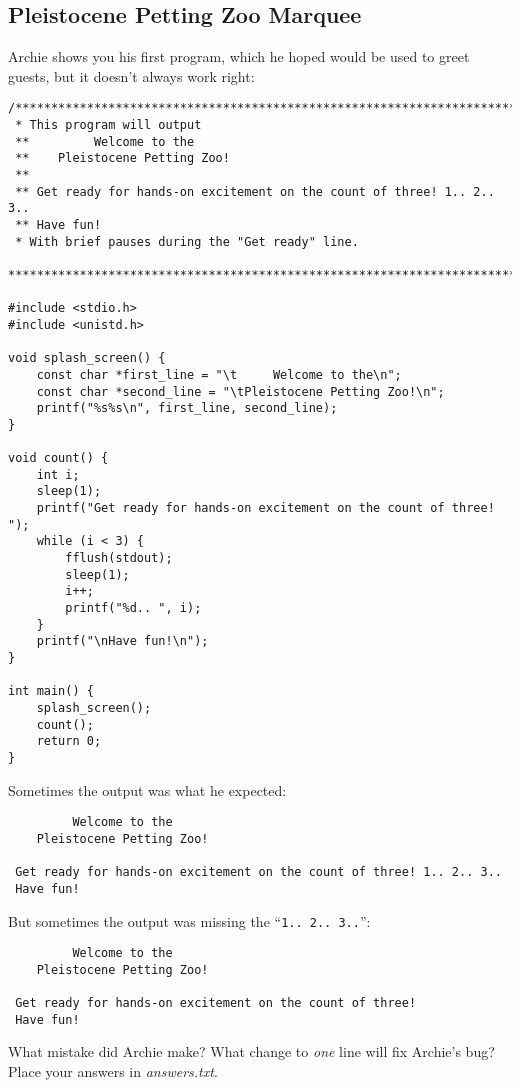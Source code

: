 \subsection{Pleistocene Petting Zoo Marquee} \label{subsec:uninitializedvariables}

Archie shows you his first program, which he hoped would be used to greet guests, but it doesn't always work right:

\begin{lstlisting}
/***********************************************************************
 * This program will output
 **         Welcome to the
 **    Pleistocene Petting Zoo!
 **
 ** Get ready for hands-on excitement on the count of three! 1.. 2.. 3..
 ** Have fun!
 * With brief pauses during the "Get ready" line.
 ***********************************************************************/

#include <stdio.h>
#include <unistd.h>

void splash_screen() {
    const char *first_line = "\t     Welcome to the\n";
    const char *second_line = "\tPleistocene Petting Zoo!\n";
    printf("%s%s\n", first_line, second_line);
}

void count() {
    int i;
    sleep(1);
    printf("Get ready for hands-on excitement on the count of three! ");
    while (i < 3) {
        fflush(stdout);
        sleep(1);
        i++;
        printf("%d.. ", i);
    }
    printf("\nHave fun!\n");
}

int main() {
    splash_screen();
    count();
    return 0;
}
\end{lstlisting}

Sometimes the output was what he expected:
\begin{verbatim}
         Welcome to the
    Pleistocene Petting Zoo!

 Get ready for hands-on excitement on the count of three! 1.. 2.. 3..
 Have fun!
\end{verbatim}

But sometimes the output was missing the
``\texttt{1.. 2.. 3..}'':
\begin{verbatim}
         Welcome to the
    Pleistocene Petting Zoo!

 Get ready for hands-on excitement on the count of three!
 Have fun!
\end{verbatim}

What mistake did Archie make?
What change to \textit{one} line will fix Archie's bug?
Place your answers in \textit{answers.txt}.

